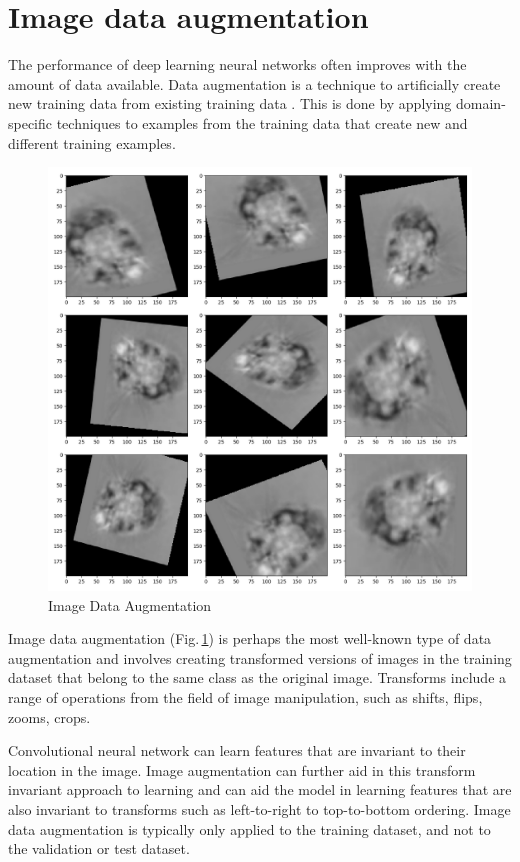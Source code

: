 \section{Image data augmentation}

The performance of deep learning neural networks often improves with the amount of data available. Data augmentation is a technique to artificially create new training data from existing training data \citep{Mikolajczyk2018}. This is done by applying domain-specific techniques to examples from the training data that create new and different training examples.

\begin{figure}[h]
	\centering
	\includegraphics[width=.5\textwidth]{Figs/dataaug.jpg}
    \caption{Image Data Augmentation}
    \label{dataaug}
\end{figure}

Image data augmentation (Fig.\,\ref{dataaug}) is perhaps the most well-known type of data augmentation and involves creating transformed versions of images in the training dataset that belong to the same class as the original image. Transforms include a range of operations from the field of image manipulation, such as shifts, flips, zooms, crops.

Convolutional neural network can learn features that are invariant to their location in the image. Image augmentation can further aid in this transform invariant approach to learning and can aid the model in learning features that are also invariant to transforms such as left-to-right to top-to-bottom ordering. Image data augmentation is typically only applied to the training dataset, and not to the validation or test dataset. 



